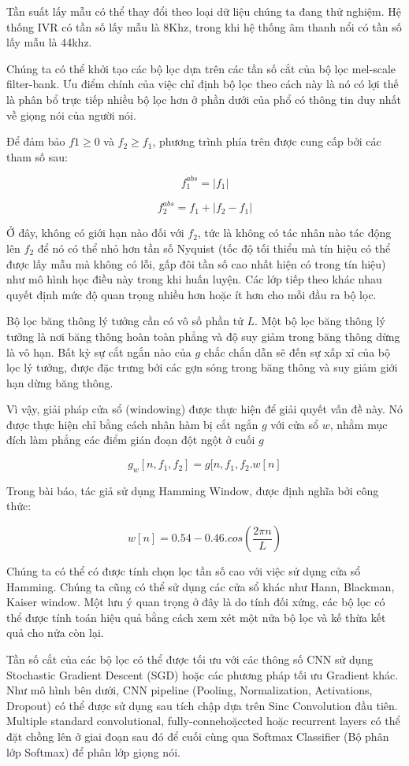 \documentclass{article}
\begin{document}
	Tần suất lấy mẫu có thể thay đổi theo loại dữ liệu chúng ta đang thử nghiệm. Hệ thống IVR có tần số lấy mẫu là 8Khz, trong khi hệ thống âm thanh nổi có tần số lấy mẫu là 44khz.
	
	Chúng ta có thể khởi tạo các bộ lọc dựa trên các tần số cắt của bộ lọc mel-scale filter-bank. Ưu điểm chính của việc chỉ định bộ lọc theo cách này là nó có lợi thế là phân bổ trực tiếp nhiều bộ lọc hơn ở phần dưới của phổ có thông tin duy nhất về giọng nói của người nói.
	
	Để đảm bảo $f1 \geq 0$ và $f_2 \geq f_1$, phương trình phía trên được cung cấp bởi các tham số sau:
	
	$$f_{1}^{abs} = |f_1|$$
	
	$$f_{2}^{abs} = f_1 + |f_2 - f_1| $$
	
	Ở đây, không có giới hạn nào đối với $f_2$, tức là không có tác nhân nào tác động lên $f_2$ để nó có thể nhỏ hơn tần số Nyquist (tốc độ tối thiểu mà tín hiệu có thể được lấy mẫu mà không có lỗi, gấp đôi tần số cao nhất hiện có trong tín hiệu) như mô hình học điều này trong khi huấn luyện. Các lớp tiếp theo khác nhau quyết định mức độ quan trọng nhiều hơn hoặc ít hơn cho mỗi đầu ra bộ lọc.
	
	Bộ lọc băng thông lý tưởng cần có vô số phần tử $L$. Một bộ lọc băng thông lý tưởng là nơi băng thông hoàn toàn phẳng và độ suy giảm trong băng thông dừng là vô hạn. Bất kỳ sự cắt ngắn nào của $g$ chắc chắn dẫn sẽ đến sự xấp xỉ của bộ lọc lý tưởng, được đặc trưng bởi các gợn sóng trong băng thông và suy giảm giới hạn dừng băng thông.
	
	Vì vậy, giải pháp cửa sổ (windowing) được thực hiện để giải quyết vấn đề này. Nó được thực hiện chỉ bằng cách nhân hàm bị cắt ngắn $g$ với cửa sổ $w$, nhằm mục đích làm phẳng các điểm gián đoạn đột ngột ở cuối $g$
	
	$$g_{w}\left[n, f_1, f_2\right] = g[n, f_1, f_2 . w[n]$$
	
	Trong bài báo, tác giả sử dụng Hamming Window, được định nghĩa bởi công thức:
	
	$$w[n] = 0.54 - 0.46.cos(\frac{2\pi n}{L})$$
	
	
	Chúng ta có thể có được tính chọn lọc tần số cao với việc sử dụng cửa sổ Hamming. Chúng ta cũng có thể sử dụng các cửa sổ khác như Hann, Blackman, Kaiser window. Một lưu ý quan trọng ở đây là do tính đối xứng, các bộ lọc có thể được tính toán hiệu quả bằng cách xem xét một nửa bộ lọc và kế thừa kết quả cho nửa còn lại.
	
	Tần số cắt của các bộ lọc có thể được tối ưu với các thông số CNN sử dụng Stochastic Gradient Descent (SGD) hoặc các phương pháp tối ưu Gradient khác. Như mô hình bên dưới, CNN pipeline (Pooling, Normalization, Activations, Dropout) có thể được sử dụng sau tích chập dựa trên Sinc Convolution đầu tiên. Multiple standard convolutional, fully-connehoặccted hoặc recurrent layers có thể đặt chồng lên ở giai đoạn sau đó để cuối cùng qua Softmax Classifier (Bộ phân lớp Softmax) để phân lớp giọng nói.
	
\end{document}
